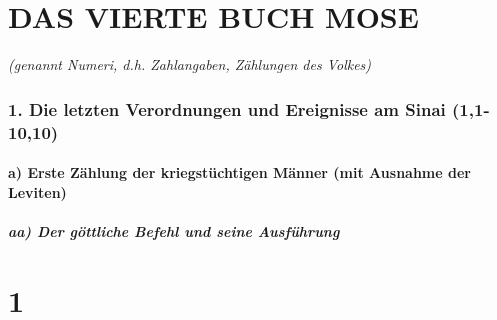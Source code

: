 \hypertarget{das-vierte-buch-mose}{%
\section{DAS VIERTE BUCH MOSE}\label{das-vierte-buch-mose}}

\emph{(genannt Numeri, d.h. Zahlangaben, Zählungen des Volkes)}

\hypertarget{die-letzten-verordnungen-und-ereignisse-am-sinai-11-1010}{%
\subsubsection{1. Die letzten Verordnungen und Ereignisse am Sinai
(1,1-10,10)}\label{die-letzten-verordnungen-und-ereignisse-am-sinai-11-1010}}

\hypertarget{a-erste-zuxe4hlung-der-kriegstuxfcchtigen-muxe4nner-mit-ausnahme-der-leviten}{%
\paragraph{a) Erste Zählung der kriegstüchtigen Männer (mit Ausnahme der
Leviten)}\label{a-erste-zuxe4hlung-der-kriegstuxfcchtigen-muxe4nner-mit-ausnahme-der-leviten}}

\hypertarget{aa-der-guxf6ttliche-befehl-und-seine-ausfuxfchrung}{%
\subparagraph{aa) Der göttliche Befehl und seine
Ausführung}\label{aa-der-guxf6ttliche-befehl-und-seine-ausfuxfchrung}}

\hypertarget{section}{%
\section{1}\label{section}}

